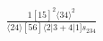 \documentclass[varwidth, border=5pt]{standalone}
\begin{document}
\begin{my}
$\begin{gathered}
\scriptscriptstyle\frac{1[15]^2⟨34⟩^2}{⟨24⟩[56]⟨2|3+4|1]s_{234}}
\end{gathered}$
\end{my}
\end{document}
